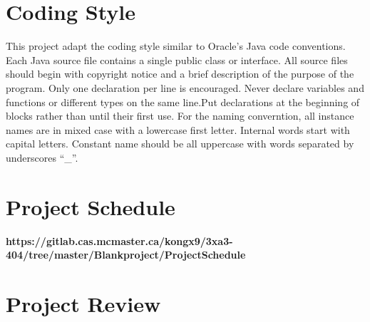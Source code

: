 \documentclass{article}
\begin{document}
\section{Coding Style}
This project adapt the coding style similar to Oracle's Java code conventions. Each Java source file contains a single public class or interface. All source files should begin with copyright notice and a brief description of the purpose of the program. Only one declaration per line is encouraged. Never declare variables and functions or different types on the same line.Put declarations at the beginning of blocks rather than until their first use. For the naming converntion, all instance names are in mixed case with a lowercase first letter. Internal words start with capital letters. Constant name should be all uppercase with words separated by underscores “\_”.
\section{Project Schedule}

\textbf{https://gitlab.cas.mcmaster.ca/kongx9/3xa3-404/tree/master/Blankproject/ProjectSchedule}

\section{Project Review}
\end{document}
